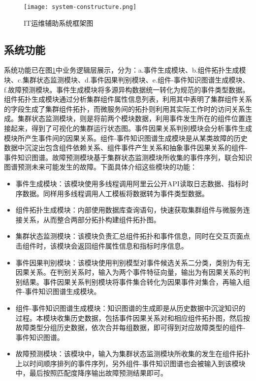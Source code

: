 \begin{figure}[htbp]
    \centering
    \texttt{[image: system-constructure.png]}
    \caption{IT运维辅助系统框架图\label{system-constructure}}
\end{figure}

\subsection{系统功能}\label{system-function}
系统功能已在图\ref{system-constructure}中业务逻辑层展示，分为：a.事件生成模块、b.组件拓扑生成模块、c.集群状态监测模块、d.事件因果判别模块、e.组件-事件知识图谱生成模块、f.故障预测模块。事件生成模块将多源异构数据统一转化为规范的事件类型数据。组件拓扑生成模块通过分析集群组件属性信息列表，利用其中表明了集群组件关系的字段生成了集群组件拓扑，而微服务间的拓扑则利用其实际工作时的访问关系生成。集群状态监测模块，则是将前两个模块数据，利用事件发生所在的组件位置连接起来，得到了可视化的集群运行状态图。事件因果关系判别模块会分析事件生成模块所产生事件间的因果关系。组件-事件知识图谱生成模块是从某类故障的历史数据中沉淀出包含组件依赖关系、组件事件产生关系和抽象事件因果关系的组件-事件知识图谱。故障预测模块基于集群状态监测模块所收集的事件序列，联合知识图谱预测未来可能发生的故障。下面具体介绍这些模块的功能：
\begin{itemize}
    \item [（1）]事件生成模块：该模块使用多线程调用阿里云公开API读取日志数据、指标时序数据。同样用多线程调用人工模板将数据转为事件类型数据。
    \item [（2）]组件拓扑生成模块：内部使用数据库查询语句，快速获取集群组件与微服务连接关系，从而整合两部分拓扑构建组件拓扑图。
    \item [（3）]集群状态监测模块：该模块负责汇总组件拓扑和事件信息，同时在交互页面点击组件时，该模块会返回组件属性信息和指标时序信息。
    \item [（4）]事件因果判别模块：该模块使用判别模型对事件候选关系二分类，类别为有无因果关系。在判别关系时，输入为两个事件特征向量，输出为有因果关系的判别结果。事件因果关系判别模块将事件集合转化为因果事件对集合，再输入组件-事件知识图谱生成模块。
    \item [（5）]组件-事件知识图谱生成模块：知识图谱的生成即是从历史数据中沉淀知识的过程。本模块收集历史数据，包括事件因果关系对和相应组件拓扑图，然后按故障类型分组历史数据，依次合并每组数据，即可得到对应故障类型的组件-事件知识图谱。
    \item [（6）]故障预测模块：该模块中，输入为集群状态监测模块所收集的发生在组件拓扑上以时间顺序排列的事件序列，另外组件-事件知识图谱也会被输入到该模块中，最后按照匹配度降序输出故障预测结果即可。
\end{itemize}

